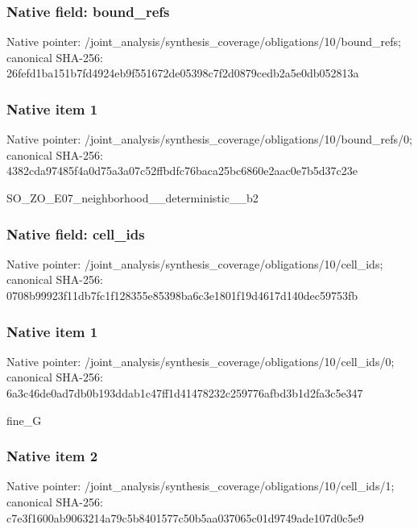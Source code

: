 \documentclass[10pt,a4paper]{article}
\begin{document}
\subsubsection{Native field: bound\_\allowbreak{}refs}
Native pointer: /joint\_\allowbreak{}analysis/synthesis\_\allowbreak{}coverage/obligations/10/bound\_\allowbreak{}refs; canonical SHA-256: 26fefd1ba151b7fd4924eb9f551672de05398c7f2d0879cedb2a5e0db052813a

\subsubsection{Native item 1}
Native pointer: /joint\_\allowbreak{}analysis/synthesis\_\allowbreak{}coverage/obligations/10/bound\_\allowbreak{}refs/0; canonical SHA-256: 4382cda97485f4a0d75a3a07c52ffbdfc76baca25bc6860e2aac0e7b5d37c23e

\begingroup\raggedright\sloppy SO\_\allowbreak{}ZO\_\allowbreak{}E07\_\allowbreak{}neighborhood\_\allowbreak{}\_\allowbreak{}deterministic\_\allowbreak{}\_\allowbreak{}b2\par\endgroup

\subsubsection{Native field: cell\_\allowbreak{}ids}
Native pointer: /joint\_\allowbreak{}analysis/synthesis\_\allowbreak{}coverage/obligations/10/cell\_\allowbreak{}ids; canonical SHA-256: 0708b99923f11db7fc1f128355e85398ba6c3e1801f19d4617d140dec59753fb

\subsubsection{Native item 1}
Native pointer: /joint\_\allowbreak{}analysis/synthesis\_\allowbreak{}coverage/obligations/10/cell\_\allowbreak{}ids/0; canonical SHA-256: 6a3c46de0ad7db0b193ddab1c47ff1d41478232c259776afbd3b1d2fa3c5e347

\begingroup\raggedright\sloppy fine\_\allowbreak{}G\par\endgroup

\subsubsection{Native item 2}
Native pointer: /joint\_\allowbreak{}analysis/synthesis\_\allowbreak{}coverage/obligations/10/cell\_\allowbreak{}ids/1; canonical SHA-256: c7e3f1600ab9063214a79c5b8401577c50b5aa037065c01d9749ade107d0c5e9
\end{document}

